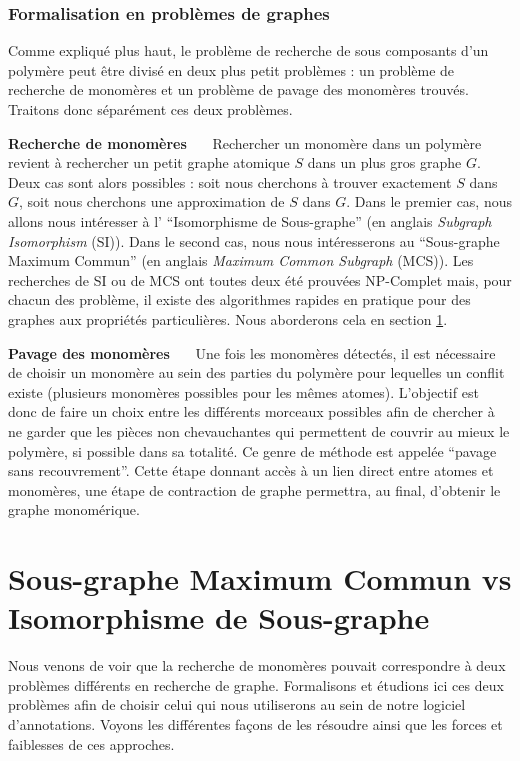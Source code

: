 \subsubsection{Formalisation en problèmes de graphes}

Comme expliqué plus haut, le problème de recherche de sous composants d'un polymère peut être divisé en deux
plus petit problèmes : un problème de recherche de monomères et un problème de pavage des monomères trouvés. Traitons
donc séparément ces deux problèmes.

\textbf{Recherche de monomères}~~~
Rechercher un monomère dans un polymère revient à rechercher un petit graphe atomique
$S$ dans un plus gros graphe $G$. Deux cas sont alors possibles : soit nous cherchons à trouver exactement $S$ dans
$G$, soit nous cherchons une approximation de $S$ dans $G$. Dans le premier cas, nous allons nous intéresser à l'
``Isomorphisme de Sous-graphe'' (en anglais \textit{Subgraph Isomorphism} (SI)). Dans le second cas, nous nous intéresserons au
``Sous-graphe Maximum Commun'' (en anglais \textit{Maximum Common Subgraph} (MCS)). Les recherches de SI ou de MCS ont toutes
deux été prouvées NP-Complet mais, pour chacun des problème, il existe des algorithmes rapides en pratique pour des graphes
aux propriétés particulières.
Nous aborderons cela en section \ref{SI_MCS}.

\textbf{Pavage des monomères}~~~
Une fois les monomères détectés, il est nécessaire de choisir un monomère au sein des parties du polymère pour lequelles un conflit existe (plusieurs monomères possibles pour les mêmes atomes).
L'objectif est donc de faire un choix entre les différents morceaux possibles afin de chercher à ne garder que les pièces non chevauchantes qui permettent de couvrir au mieux le polymère, si possible dans sa totalité.
Ce genre de méthode est appelée ``pavage sans recouvrement''.
Cette étape donnant accès à un lien direct entre atomes et monomères, une étape de contraction de graphe permettra, au final, d'obtenir le graphe monomérique.




\section{Sous-graphe Maximum Commun vs Isomorphisme de Sous-graphe}
\label{SI_MCS}

Nous venons de voir que la recherche de monomères pouvait correspondre à deux problèmes différents en recherche de graphe.
Formalisons et étudions ici ces deux problèmes afin de choisir celui qui nous utiliserons au sein de notre logiciel d'annotations.
Voyons les différentes façons de les résoudre ainsi que les forces et faiblesses de ces approches.


